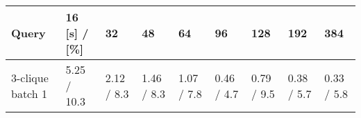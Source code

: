 \begin{tabular}{lllllllll}
\toprule
            Query & 16 [s] / [\%] &          32 &          48 &          64 &          96 &         128 &         192 &         384 \\
\midrule
 3-clique batch 1 &  5.25 / 10.3 &  2.12 / 8.3 &  1.46 / 8.3 &  1.07 / 7.8 &  0.46 / 4.7 &  0.79 / 9.5 &  0.38 / 5.7 &  0.33 / 5.8 \\
\bottomrule
\end{tabular}
